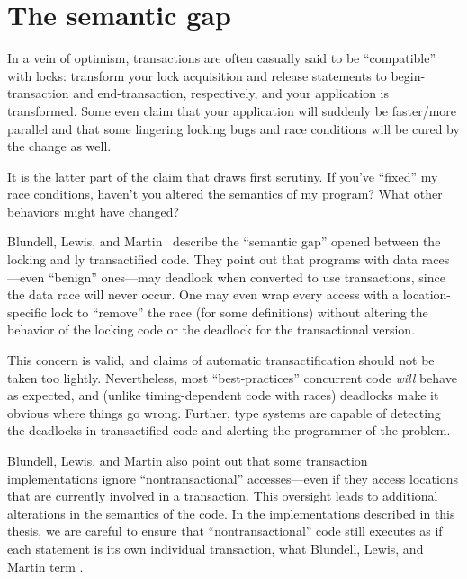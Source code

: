 \section{The semantic gap}\label{sec:semantic}
In a vein of optimism, transactions are often casually said to be
``compatible'' with locks: transform your lock acquisition and release
statements to begin-transaction and end-transaction, respectively, and
your application is transformed.  Some even claim that your
application will suddenly be faster/more parallel and that some
lingering locking bugs and race conditions will be cured by the change
as well.

It is the latter part of the claim that draws first scrutiny.  If
you've ``fixed'' my race conditions, haven't you altered the semantics
of my program?  What other behaviors might have changed?

Blundell, Lewis, and Martin~\cite{BlundellLeMa05} describe the
``semantic gap'' opened between the locking and
\naive{}ly transactified code.  They point out that programs with
data races---even ``benign'' ones---may deadlock when converted to
use transactions, since the data race will never occur.  One may even
wrap every access with a location-specific lock to ``remove'' the race
(for some definitions) without altering the behavior of the locking
code or the deadlock for the transactional version.

This concern is valid, and claims of automatic transactification
should not be taken too lightly.  Nevertheless, most ``best-practices''
concurrent code \emph{will} behave as expected, and (unlike
timing-dependent code with races) deadlocks make it obvious where
things go wrong.  Further, type systems are capable of detecting the
deadlocks in transactified code and alerting
the programmer of the problem.

Blundell, Lewis, and Martin also point out that some transaction
implementations ignore ``nontransactional'' accesses---even if they access
locations that are currently involved in a transaction.  This oversight
leads to additional alterations in the semantics of the code.  In the
implementations described in this thesis, we are careful to ensure
that ``nontransactional'' code still executes as if each statement
is its own individual transaction, what Blundell, Lewis, and Martin
term .

